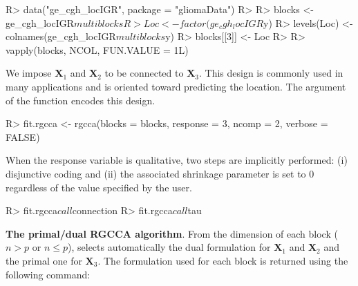 \documentclass[
]{jss}
\begin{document}
\normalsize

\footnotesize

\begin{CodeChunk}
\begin{CodeInput}
R> data("ge_cgh_locIGR", package = "gliomaData")
R> 
R> blocks <- ge_cgh_locIGR$multiblocks
R> Loc <- factor(ge_cgh_locIGR$y)
R> levels(Loc) <- colnames(ge_cgh_locIGR$multiblocks$y)
R> blocks[[3]] <- Loc
R> 
R> vapply(blocks, NCOL, FUN.VALUE = 1L)
\end{CodeInput}
\end{CodeChunk}

\normalsize

We impose \(\mathbf{X}_1\) and \(\mathbf{X}_2\) to be connected to
\(\mathbf{X}_3\). This design is commonly used in many applications and
is oriented toward predicting the location. The argument
 of the  function encodes this design.

\footnotesize

\begin{CodeChunk}
\begin{CodeInput}
R> fit.rgcca <- rgcca(blocks = blocks, response = 3, ncomp = 2, verbose = FALSE)
\end{CodeInput}
\end{CodeChunk}

\normalsize

When the response variable is qualitative, two steps are implicitly
performed: (i) disjunctive coding and (ii) the associated shrinkage
parameter is set to \(0\) regardless of the value specified by the user.

\footnotesize

\begin{CodeChunk}
\begin{CodeInput}
R> fit.rgcca$call$connection
R> fit.rgcca$call$tau
\end{CodeInput}
\end{CodeChunk}

\normalsize

\textbf{The primal/dual RGCCA algorithm}. From the dimension of each
block (\(n>p\) or \(n\leq p\)),  selects automatically the
dual formulation for \(\mathbf{X}_1\) and \(\mathbf{X}_2\) and the
primal one for \(\mathbf{X}_3\). The formulation used for each block is
returned using the following command:

\footnotesize

\begin{CodeChunk}
\end{CodeChunk}
\end{document}
